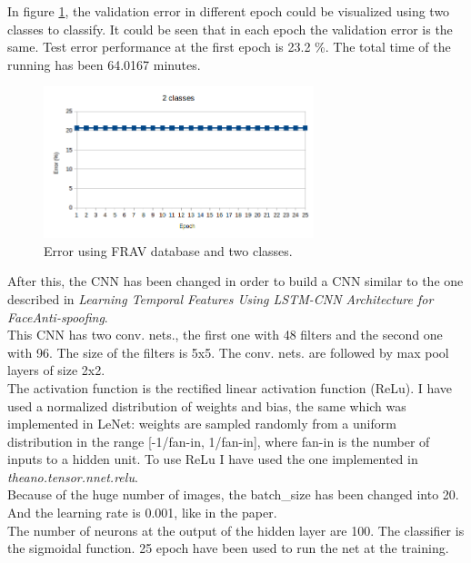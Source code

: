 In figure \ref{fig:FRAV_two}, the validation error in different epoch could be visualized using two classes to classify. It could be seen that in each epoch the validation error is the same. Test error performance at the first epoch is 23.2 \%. The total time of the running has been 64.0167 minutes.\\

\begin{figure}[htb]
\centering
\includegraphics[width=0.7\textwidth]{images/epoch_2classes_FRAV_1.png}
\caption{Error using FRAV database and two classes.}
\label{fig:FRAV_two}
\end{figure}

After this, the CNN has been changed in order to build a CNN similar to the one described in \textit{Learning Temporal Features Using LSTM-CNN Architecture for FaceAnti-spoofing}.\\

This CNN has two conv. nets., the first one with 48 filters and the second one with 96. The size of the filters is 5x5. The conv. nets. are followed by max pool layers of size 2x2.\\

The activation function is the rectified linear activation function (ReLu). I have used a normalized distribution of weights and bias, the same which was implemented in LeNet: weights are sampled randomly from a uniform distribution in the range [-1/fan-in, 1/fan-in], where fan-in is the number of inputs to a hidden unit. To use ReLu I have used the one implemented in \textit{theano.tensor.nnet.relu}.\\

Because of the huge number of images, the  batch\_size has been changed into 20. And the learning rate is 0.001, like in the paper.\\

The number of neurons at the output of the hidden layer are 100. The classifier is the sigmoidal function. 25 epoch have been used to run the net at the training.\\

